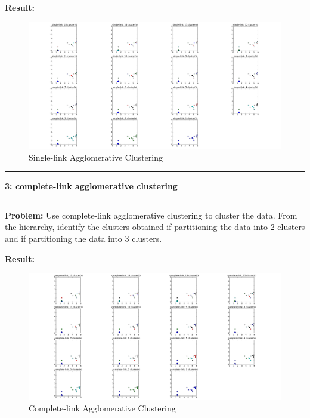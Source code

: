 \documentclass[11pt]{article}
\newcommand\question[2]{\vspace{.25in}\hrule\textbf{#1: #2}\vspace{.5em}\hrule\vspace{.10in}}
\newcommand\problem{\vspace{.10in}\textbf{Problem: }}
\newcommand\result{\vspace{.10in}\textbf{Result: }}
\begin{document}
\result
\begin{figure}[h]
\centering
\includegraphics[width=\textwidth]{single.pdf}
\caption{Single-link Agglomerative Clustering}
\label{convergence1}
\end{figure}
\clearpage




\question{3}{complete-link agglomerative clustering}

\problem Use complete-link agglomerative clustering to cluster the data. From the hierarchy, identify the clusters obtained if partitioning the data into 2 clusters and if partitioning the data into 3 clusters.

\result
\begin{figure}[h]
\centering
\includegraphics[width=\textwidth]{complete.pdf}
\caption{Complete-link Agglomerative Clustering}
\label{convergence1}
\end{figure}
\end{document}
